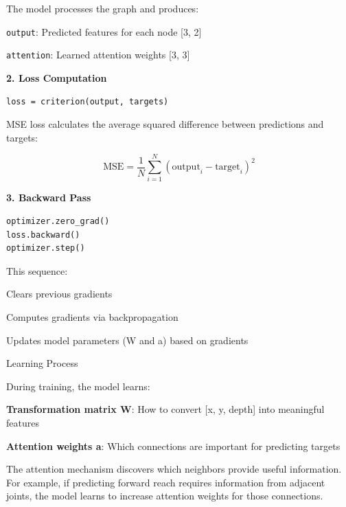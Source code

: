The model processes the graph and produces:
\begin{compactitem}
   \item \texttt{output}: Predicted features for each node [3, 2]
   \item \texttt{attention}: Learned attention weights [3, 3]
\end{compactitem}

\textbf{2. Loss Computation}

\begin{lstlisting}[style=pythonstyle]
loss = criterion(output, targets)
\end{lstlisting}

MSE loss calculates the average squared difference between predictions and targets:

\begin{equation}
   \label{eq:mse_loss}   
   \text{MSE} = \frac{1}{N} \sum_{i=1}^{N} (\text{output}_i - \text{target}_i)^2
\end{equation}

\textbf{3. Backward Pass}

\begin{lstlisting}[style=pythonstyle]
optimizer.zero_grad()
loss.backward()
optimizer.step()
\end{lstlisting}

This sequence:
\begin{compactitem}
   \item Clears previous gradients
   \item Computes gradients via backpropagation
   \item Updates model parameters (W and a) based on gradients
\end{compactitem}

Learning Process

During training, the model learns:

\begin{compactitem}
   \item \textbf{Transformation matrix W}: How to convert [x, y, depth] into meaningful features
   \item \textbf{Attention weights a}: Which connections are important for predicting targets
\end{compactitem}

The attention mechanism discovers which neighbors provide useful information.
For example, if predicting forward reach requires information from adjacent
joints, the model learns to increase attention weights for those connections.

